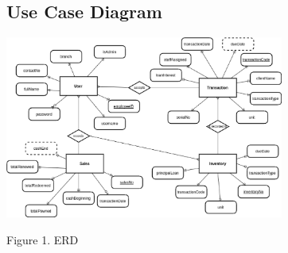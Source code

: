 \documentclass[journal]{./IEEE/IEEEtran}
\begin{document}
\subsection{Use Case Diagram}
\begin{center}

\includegraphics[height=60mm]{./images/erd.eps}

Figure 1. ERD

\end{center}
\end{document}
